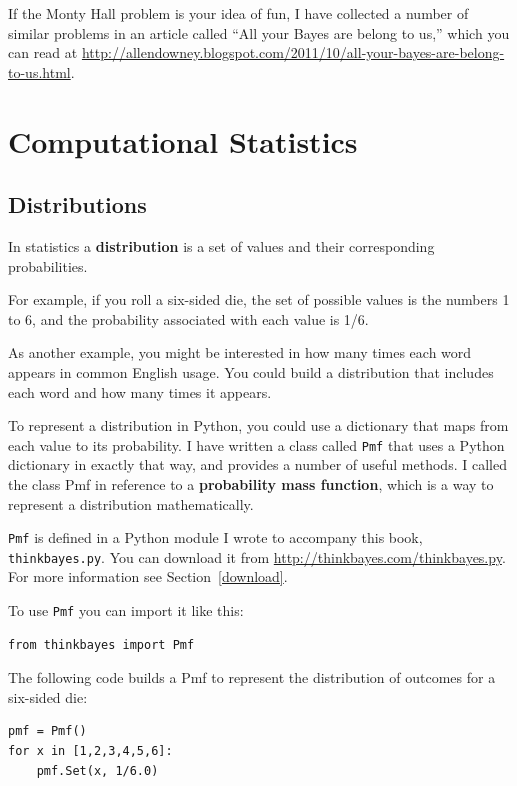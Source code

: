 \documentclass[12pt]{book}
\begin{document}
If the Monty Hall problem is your idea of fun, I have collected a
number of similar problems in an article called ``All your Bayes are
belong to us,'' which you can read at
\url{http://allendowney.blogspot.com/2011/10/all-your-bayes-are-belong-to-us.html}.


\chapter{Computational Statistics}
\label{compstat}

\section{Distributions}

In statistics a {\bf distribution} is a set of values and their
corresponding probabilities.

For example, if you roll a six-sided die, the set of possible
values is the numbers 1 to 6, and the probability associated
with each value is 1/6.

As another example, you might be interested in how many times each
word appears in common English usage.  You could build a distribution
that includes each word and how many times it appears.

To represent a distribution in Python, you could use a dictionary that
maps from each value to its probability.  I have written a class
called {\tt Pmf} that uses a Python dictionary in exactly that way,
and provides a number of useful methods.
I called the class Pmf in reference to 
a {\bf probability mass function}, which is a way to
represent a distribution mathematically.

{\tt Pmf} is defined in a Python module I wrote to accompany this
book, {\tt thinkbayes.py}.  You can download it from
\url{http://thinkbayes.com/thinkbayes.py}.    For more information
see Section~\ref{download}.

To use {\tt Pmf} you can import it like this:

\begin{verbatim}
from thinkbayes import Pmf
\end{verbatim}

The following code builds a Pmf to represent the distribution
of outcomes for a six-sided die:

\begin{verbatim}
pmf = Pmf()
for x in [1,2,3,4,5,6]:
    pmf.Set(x, 1/6.0)
\end{verbatim}
\end{document}
